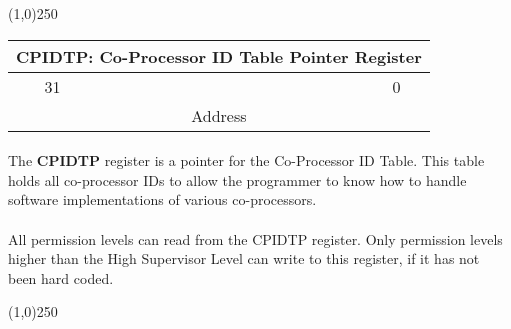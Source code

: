 \documentclass[letterpaper, 11pt]{article}
\begin{document}
\begin{center}
	\line(1,0){250}
\end{center}

\vspace{1 cm}

\begin{center}
	\begin{tabular}{|cccccccc|}
		\multicolumn{8}{c}{\textbf{CPIDTP}: Co-Processor ID Table Pointer  Register} \\ \hline
		31\hfill & \hfill  & \hfill & \hfill & \hfill & \hfill & \hfill &\hfill	0 \\ \hline
		\multicolumn{8}{|c|}{Address}   \\ \hline
		
	\end{tabular}
\end{center}

\paragraph{} The \textbf{CPIDTP} register is a pointer for the Co-Processor ID Table.
This table holds all co-processor IDs to allow the programmer to know how to handle software implementations of various co-processors.
\paragraph{} All permission levels can read from the CPIDTP register. Only permission
levels higher than the High Supervisor Level can write to this register, if it
has not been hard coded.

\begin{center}
	\line(1,0){250}
\end{center}

\vspace{1 cm}
\end{document}
